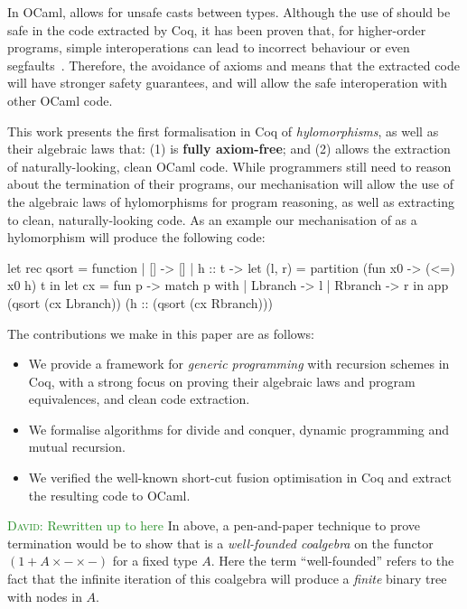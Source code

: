 \documentclass[anonymous, a4paper, UKenglish, cleveref, autoref, thm-restate]{lipics-v2021}
\newcommand{\dcas}[1]{\textcolor{ForestGreen}{\textsc{David}: #1}}
\begin{document}
In OCaml,  allows for unsafe casts between types.
Although the use of  should be safe in the code
extracted by Coq, it has been proven that, for higher-order programs, simple
interoperations can lead to incorrect behaviour or even
segfaults~\cite{forster:hal-04329663}. Therefore, the avoidance of axioms and
 means that the extracted code will have stronger
safety guarantees, and will allow the safe interoperation with other OCaml
code.

This work presents the first formalisation in Coq of \emph{hylomorphisms}, as
well as their algebraic laws that: (1) is \textbf{fully axiom-free}; and (2)
allows the extraction of naturally-looking, clean OCaml code. While programmers
still need to reason about the termination of their programs, our mechanisation
will allow the use of the algebraic laws of hylomorphisms for program
reasoning, as well as extracting to clean, naturally-looking code. As an
example our mechanisation of  as a hylomorphism will produce
the following code:
\begin{coqcode}
let rec qsort = function
  | [] -> []
  | h :: t ->
    let (l, r) = partition (fun x0 -> (<=) x0 h) t in
    let cx = fun p -> match p with | Lbranch -> l | Rbranch -> r in 
    app (qsort (cx Lbranch)) (h :: (qsort (cx Rbranch)))
\end{coqcode}

The contributions we make in this paper are as follows:
\begin{itemize}
  \item We provide a framework for \emph{generic programming} with recursion
    schemes in Coq, with a strong focus on proving their algebraic laws and 
    program equivalences, and clean code extraction.
  \item We formalise algorithms for divide and conquer, dynamic programming and
    mutual recursion.
  \item We verified the well-known short-cut fusion optimisation in Coq and
    extract the resulting code to OCaml.
\end{itemize}

\dcas{Rewritten up to here}
In
 above, a pen-and-paper technique to prove termination would
be to show that  is a \emph{well-founded coalgebra} on the
functor $(1 + A \times - \times -)$ for a fixed type $A$. Here the term
``well-founded'' refers to the fact that the infinite iteration of this
coalgebra will produce a \emph{finite} binary tree with nodes in $A$.
\end{document}
